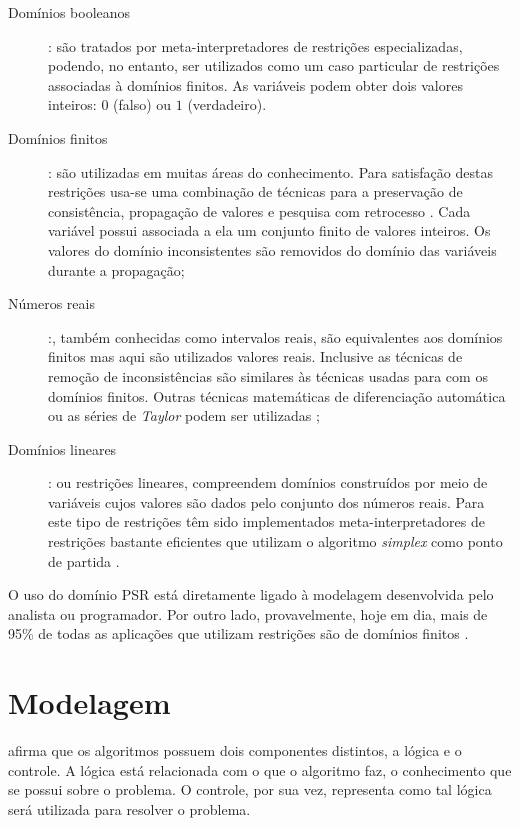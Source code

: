 \begin{description}



  \item [Domínios booleanos]: são tratados por meta-interpretadores de restrições especializadas, podendo, no entanto, ser utilizados como um caso particular de restrições associadas à domínios finitos. As variáveis podem obter dois valores inteiros: $0$ (falso) ou $1$ (verdadeiro).

  \item [Domínios finitos]: são utilizadas em muitas áreas do conhecimento. Para satisfação destas restrições usa-se uma combinação de técnicas para a preservação de consistência, propagação de valores e pesquisa com retrocesso \cite{sucupira_03, apt_2003}. Cada variável possui associada a ela um conjunto finito de valores inteiros. Os valores do domínio inconsistentes são removidos do domínio das variáveis durante a propagação;

  \item [Números reais]:, também conhecidas como intervalos reais, são equivalentes aos domínios finitos mas aqui são utilizados valores reais. Inclusive as técnicas de remoção de inconsistências são similares às técnicas usadas para com os domínios finitos. Outras técnicas matemáticas de diferenciação automática ou as séries de \textit{Taylor} podem ser utilizadas \cite{sucupira_03};

  \item [Domínios lineares]: ou restrições lineares, compreendem domínios construídos por meio de variáveis cujos valores são dados pelo conjunto dos números reais. Para este tipo de restrições têm sido implementados meta-interpretadores de restrições bastante eficientes que utilizam o algoritmo \textit{simplex} como ponto de partida \cite{sucupira_03}.
\end{description}


O uso do domínio PSR está diretamente ligado à modelagem desenvolvida pelo analista ou programador. Por outro lado, provavelmente, hoje em dia, mais de 95\% de todas as aplicações que utilizam restrições são de domínios finitos \cite{tsang93, apt2003}. 



\section{Modelagem} \label{sc-modelagem}

\cite{kowalski} afirma que os algoritmos possuem dois componentes distintos, a lógica e o controle. A lógica está relacionada com o que o algoritmo faz, o conhecimento que se possui sobre o problema. O controle, por sua vez, representa como tal lógica será utilizada para resolver o problema.

